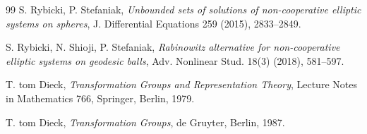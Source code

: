 \documentclass[reqno,twoside,12pt]{amsart}
\numberwithin{equation}{section} \errorcontextlines=0
\begin{document}
\begin{thebibliography}{99}
 S. Rybicki, P. Stefaniak, \emph{Unbounded sets of solutions of non-cooperative elliptic systems on spheres}, J. Differential Equations 259 (2015), 2833--2849.

 S. Rybicki, N. Shioji, P. Stefaniak, \emph{Rabinowitz alternative for non-cooperative elliptic systems on geodesic balls}, Adv. Nonlinear Stud. 18(3) (2018), 581--597.

 T. tom Dieck, \emph{Transformation Groups and Representation Theory}, Lecture Notes in Mathematics 766, Springer, Berlin, 1979.

 T. tom Dieck, \emph{Transformation Groups}, de Gruyter, Berlin, 1987.

\end{thebibliography}
\end{document}
